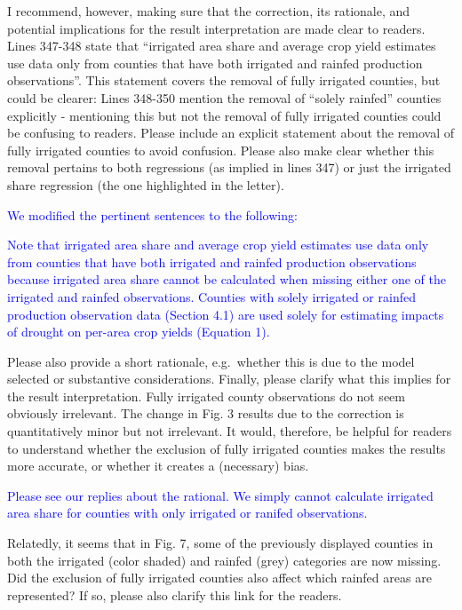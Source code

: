 \documentclass[
]{article}
\begin{document}
I recommend, however, making sure that the correction, its rationale,
and potential implications for the result interpretation are made clear
to readers. Lines 347-348 state that ``irrigated area share and average
crop yield estimates use data only from counties that have both
irrigated and rainfed production observations''. This statement covers
the removal of fully irrigated counties, but could be clearer: Lines
348-350 mention the removal of ``solely rainfed'' counties explicitly -
mentioning this but not the removal of fully irrigated counties could be
confusing to readers. Please include an explicit statement about the
removal of fully irrigated counties to avoid confusion. Please also make
clear whether this removal pertains to both regressions (as implied in
lines 347) or just the irrigated share regression (the one highlighted
in the letter).

\textcolor{blue}{We modified the pertinent sentences to the following:}

\textcolor{blue}{Note that irrigated area share and average crop yield estimates use data only from counties that have both irrigated and rainfed production observations because irrigated area share cannot be calculated when missing either one of the irrigated and rainfed observations. Counties with solely irrigated or rainfed production observation data (Section 4.1) are used solely for estimating impacts of drought on per-area crop yields (Equation 1).}

Please also provide a short rationale, e.g.~whether this is due to the
model selected or substantive considerations. Finally, please clarify
what this implies for the result interpretation. Fully irrigated county
observations do not seem obviously irrelevant. The change in Fig. 3
results due to the correction is quantitatively minor but not
irrelevant. It would, therefore, be helpful for readers to understand
whether the exclusion of fully irrigated counties makes the results more
accurate, or whether it creates a (necessary) bias.

\textcolor{blue}{Please see our replies about the rational. We simply cannot calculate irrigated area share for counties with only irrigated or ranifed observations.}

Relatedly, it seems that in Fig. 7, some of the previously displayed
counties in both the irrigated (color shaded) and rainfed (grey)
categories are now missing. Did the exclusion of fully irrigated
counties also affect which rainfed areas are represented? If so, please
also clarify this link for the readers.
\end{document}
